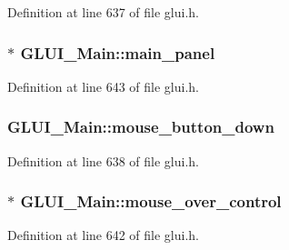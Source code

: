 Definition at line 637 of file glui.\+h.

\hypertarget{class_g_l_u_i___main_a727ecf1f0315ff01503415dc420b47a2}{
\subsubsection[{main\+\_\+panel}]{$\ast$ G\+L\+U\+I\+\_\+\+Main\+::main\+\_\+panel\hspace{0.3cm}{\ttfamily [protected]}}}\label{class_g_l_u_i___main_a727ecf1f0315ff01503415dc420b47a2}


Definition at line 643 of file glui.\+h.

\hypertarget{class_g_l_u_i___main_a5002dc3587df870eb12a62be1568861b}{
\subsubsection[{mouse\+\_\+button\+\_\+down}]{ G\+L\+U\+I\+\_\+\+Main\+::mouse\+\_\+button\+\_\+down\hspace{0.3cm}{\ttfamily [protected]}}}\label{class_g_l_u_i___main_a5002dc3587df870eb12a62be1568861b}


Definition at line 638 of file glui.\+h.

\hypertarget{class_g_l_u_i___main_a74c11c17faf8a0c957d5654c420dc97f}{
\subsubsection[{mouse\+\_\+over\+\_\+control}]{$\ast$ G\+L\+U\+I\+\_\+\+Main\+::mouse\+\_\+over\+\_\+control\hspace{0.3cm}{\ttfamily [protected]}}}\label{class_g_l_u_i___main_a74c11c17faf8a0c957d5654c420dc97f}


Definition at line 642 of file glui.\+h.

